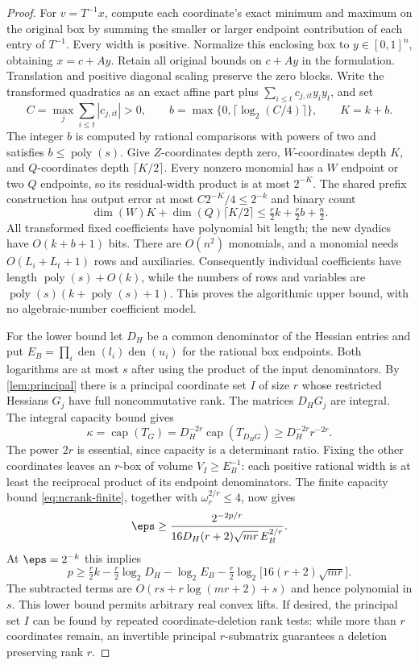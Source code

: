 \begin{proof}
For $v=T^{-1}x$, compute each coordinate's exact minimum and maximum on
the original box by summing the smaller or larger endpoint contribution
of each entry of $T^{-1}$. Every width is positive. Normalize this enclosing
box to $y\in[0,1]^n$, obtaining $x=c+Ay$. Retain all original bounds
on $c+Ay$ in the formulation. Translation and positive diagonal scaling
preserve the zero blocks. Write the transformed quadratics as an exact
affine part plus $\sum_{i\le t}c_{j,it}y_iy_t$, and set
\[
 C=\max_j\sum_{i\le t}|c_{j,it}|>0,\qquad
 b=\max\{0,\lceil\log_2(C/4)\rceil\},\qquad K=k+b.
\]
The integer $b$ is computed by rational comparisons with powers of two
and satisfies $b\le\operatorname{poly}(s)$. Give $Z$-coordinates depth
zero, $W$-coordinates depth $K$, and $Q$-coordinates depth
$\lceil K/2\rceil$. Every nonzero monomial has a $W$ endpoint or two
$Q$ endpoints, so its residual-width product is at most $2^{-K}$.
The shared prefix construction has output error at most
$C2^{-K}/4\le2^{-k}$ and binary count
\[
 \dim(W)K+\dim(Q)\lceil K/2\rceil
 \le\tfrac r2 k+\tfrac r2 b+\tfrac n2.
\]
All transformed fixed coefficients have polynomial bit length; the
new dyadics have $O(k+b+1)$ bits. There are $O(n^2)$ monomials, and a
monomial needs $O(L_i+L_t+1)$ rows and auxiliaries. Consequently individual
coefficients have length $\operatorname{poly}(s)+O(k)$, while the numbers
of rows and variables are
$\operatorname{poly}(s)(k+\operatorname{poly}(s)+1)$. This proves the
algorithmic upper bound, with no algebraic-number coefficient model.

For the lower bound let $D_H$ be a common denominator of the Hessian
entries and put $E_B=\prod_i\operatorname{den}(l_i)\operatorname{den}(u_i)$
for the rational box endpoints. Both logarithms are at most $s$ after
using the product of the input denominators. By \cref{lem:principal}
there is a principal coordinate set $I$ of size $r$ whose restricted
Hessians $G_j$ have full noncommutative rank. The matrices $D_HG_j$
are integral. The integral capacity bound
\citep[Theorem 2.18]{ggow2020} gives
\[
 \kappa=\operatorname{cap}(T_G)
 =D_H^{-2r}\operatorname{cap}(T_{D_HG})
 \ge D_H^{-2r}r^{-2r}.
\]
The power $2r$ is essential, since capacity is a determinant ratio.
Fixing the other coordinates leaves an $r$-box of volume
$V_I\ge E_B^{-1}$: each positive rational width is at least the
reciprocal product of its endpoint denominators. The finite capacity
bound \eqref{eq:ncrank-finite}, together with
$\omega_r^{2/r}\le4$, now gives
\[
 \eps\ge
 \frac{2^{-2p/r}}{16D_H(r+2)\sqrt{mr}\,E_B^{2/r}}.
\]
At $\eps=2^{-k}$ this implies
\begin{equation}\label{eq:rational-ncrank-lower-explicit}
 p\ge\tfrac r2 k-\tfrac r2\log_2D_H-\log_2E_B
       -\tfrac r2\log_2\!\bigl[16(r+2)\sqrt{mr}\bigr].
\end{equation}
The subtracted terms are $O(rs+r\log(mr+2)+s)$ and hence polynomial
in $s$. This lower bound permits arbitrary real convex lifts. If desired,
the principal set $I$ can be found by repeated coordinate-deletion rank
tests: while more than $r$ coordinates remain, an invertible principal
$r$-submatrix guarantees a deletion preserving rank $r$.
\end{proof}

